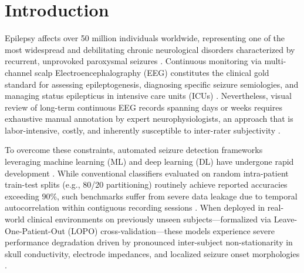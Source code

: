 \documentclass[pdflatex,sn-mathphys-num]{sn-jnl}
\begin{document}

\maketitle

\section{Introduction}\label{sec:intro}
Epilepsy affects over 50 million individuals worldwide, representing one of the most widespread and debilitating chronic neurological disorders characterized by recurrent, unprovoked paroxysmal seizures \cite{gascoigne2023library,xu2024eeg}. Continuous monitoring via multi-channel scalp Electroencephalography (EEG) constitutes the clinical gold standard for assessing epileptogenesis, diagnosing specific seizure semiologies, and managing status epilepticus in intensive care units (ICUs) \cite{guttag2010chb,obeid2016temple}. Nevertheless, visual review of long-term continuous EEG records spanning days or weeks requires exhaustive manual annotation by expert neurophysiologists, an approach that is labor-intensive, costly, and inherently susceptible to inter-rater subjectivity \cite{veloso2017big,zhang2025self}.

To overcome these constraints, automated seizure detection frameworks leveraging machine learning (ML) and deep learning (DL) have undergone rapid development \cite{shoeb2010application,gomez2020automatic,kashefiamiri2025epileptic}. While conventional classifiers evaluated on random intra-patient train-test splits (e.g., 80/20 partitioning) routinely achieve reported accuracies exceeding $90\%$, such benchmarks suffer from severe data leakage due to temporal autocorrelation within contiguous recording sessions \cite{ye2025cprsca,farooq2026patient}. When deployed in real-world clinical environments on previously unseen subjects---formalized via Leave-One-Patient-Out (LOPO) cross-validation---these models experience severe performance degradation driven by pronounced inter-subject non-stationarity in skull conductivity, electrode impedances, and localized seizure onset morphologies \cite{jang2026single,jeong2026deep}.
\end{document}
